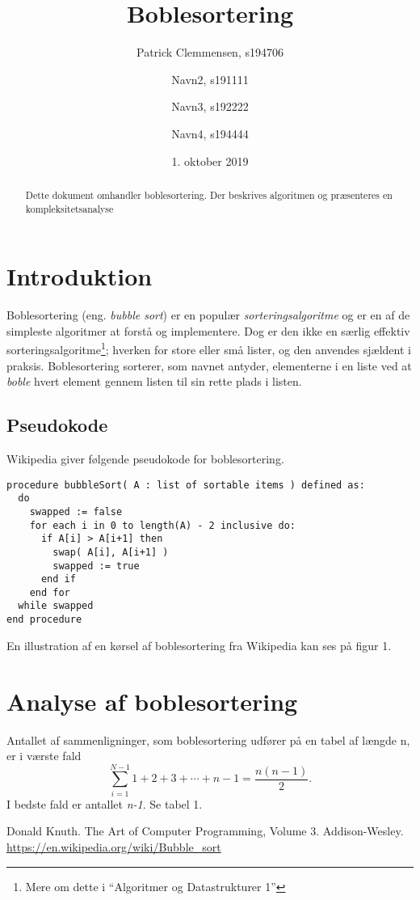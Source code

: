 \documentclass{article}
\title{\huge Boblesortering}
\author{Patrick Clemmensen, s194706 \and Navn2, s191111 \and Navn3, s192222 \and Navn4, s194444}
\date{1. oktober 2019}
\begin{document}
\maketitle



\begin{abstract}
Dette dokument omhandler boblesortering. Der beskrives algoritmen og præsenteres en kompleksitetsanalyse
\end{abstract}

\section{Introduktion}
Boblesortering (eng. \textit{bubble sort}) er en populær \textit{sorteringsalgoritme} og er en af de simpleste algoritmer at forstå og implementere. Dog er den ikke en særlig effektiv sorteringsalgoritme\footnote[1]{Mere om dette i “Algoritmer og Datastrukturer 1”}; hverken for store eller små lister, og den anvendes sjældent i praksis. Boblesortering sorterer, som navnet antyder, elementerne i en liste ved at \textit{boble} hvert element gennem listen til sin rette plads i listen.

\subsection{Pseudokode}
Wikipedia {\cite{2}} giver følgende pseudokode for boblesortering.

\begin{verbatim}
procedure bubbleSort( A : list of sortable items ) defined as:
  do
    swapped := false
    for each i in 0 to length(A) - 2 inclusive do:
      if A[i] > A[i+1] then
        swap( A[i], A[i+1] )
        swapped := true
      end if
    end for
  while swapped
end procedure
\end{verbatim}
En illustration af en kørsel af boblesortering fra Wikipedia kan ses på figur 1.


\section{Analyse af boblesortering}
Antallet af sammenligninger, som boblesortering udfører på en tabel af længde n, er i værste fald
\begin{equation}
  \sum \limits_{i = 1}^{N-1} 1+2+3+\cdots+n-1 = \frac{n(n-1)}{2}.
\end{equation}
I bedste fald er antallet \textit{n-1}. Se tabel 1.
\newpage




\begin{thebibliography}{}
    Donald Knuth. The Art of Computer Programming, Volume 3. Addison-Wesley.
    \href{https://en.wikipedia.org/wiki/Bubble_sort}{https://en.wikipedia.org/wiki/Bubble\_sort}
\end{thebibliography}
\end{document}

